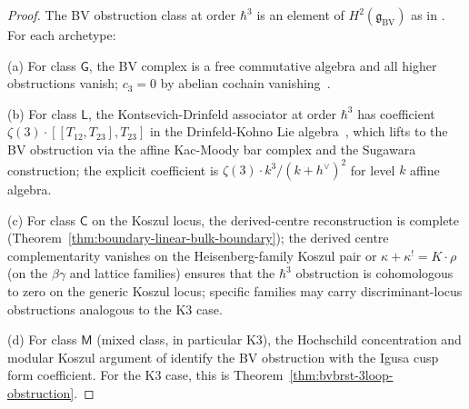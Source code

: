 \begin{proof}
The BV obstruction class at order $\hbar^3$ is an element of
$H^2(\mathfrak{g}_{\mathrm{BV}})$ as in
\cite[Ch.~5, Vol.~2]{CostelloGwilliam2021}. For each archetype:

(a) For class $\mathsf{G}$, the BV complex is a free commutative
algebra and all higher obstructions vanish; $c_3 = 0$ by abelian
cochain vanishing~\cite[Prop.~4.3]{Costello2011}.

(b) For class $\mathsf{L}$, the Kontsevich-Drinfeld associator at
order $\hbar^3$ has coefficient $\zeta(3)\cdot[[T_{12}, T_{23}],
T_{23}]$ in the Drinfeld-Kohno Lie algebra~\cite[\S 4]{Drinfeld1991},
which lifts to the BV obstruction via the affine Kac-Moody bar
complex and the Sugawara construction; the explicit coefficient is
$\zeta(3)\cdot k^3/(k+h^\vee)^2$ for level $k$ affine algebra.

(c) For class $\mathsf{C}$ on the Koszul locus, the derived-centre
reconstruction is complete (Theorem~\ref{thm:boundary-linear-bulk-boundary});
the derived centre complementarity
vanishes on the Heisenberg-family Koszul pair
or $\kappa + \kappa^! = K\cdot\rho$ (on the $\beta\gamma$ and lattice
families) ensures that the $\hbar^3$ obstruction is cohomologous to
zero on the generic Koszul locus; specific families may carry
discriminant-locus obstructions analogous to the K3 case.

(d) For class $\mathsf{M}$ (mixed class, in particular K3), the
Hochschild concentration and modular Koszul argument of
\cite[Ch.~\ref{V3-ch:k3-chiral-bialgebra-platonic}]{Lorgat3}
identify the BV obstruction with the Igusa cusp form
coefficient. For the K3 case, this is
Theorem~\ref{thm:bvbrst-3loop-obstruction}.
\end{proof}

